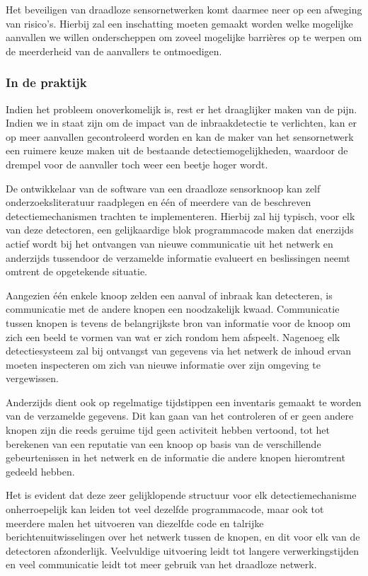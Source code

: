 \documentclass[DIV=calc,paper=a4,fontsize=11pt,twocolumn,draft]{scrartcl}
\newcommand{\heading}[1]{
\subsubsection*{#1}
\vspace{-2mm}
}
\begin{document}
Het beveiligen van draadloze sensornetwerken komt daarmee neer op een afweging
van risico's. Hierbij zal een inschatting moeten gemaakt worden welke mogelijke
aanvallen we willen onderscheppen om zoveel mogelijke barri\`eres op te werpen
om de meerderheid van de aanvallers te ontmoedigen.

\heading{In de praktijk}

Indien het probleem onoverkomelijk is, rest er het draaglijker maken van de
pijn. Indien we in staat zijn om de impact van de inbraakdetectie te
verlichten, kan er op meer aanvallen gecontroleerd worden en kan de maker van
het sensornetwerk een ruimere keuze maken uit de bestaande
detectiemogelijkheden, waardoor de drempel voor de aanvaller toch weer een
beetje hoger wordt.

De ontwikkelaar van de software van een draadloze sensorknoop kan zelf
onderzoeksliteratuur raadplegen en \'e\'en of meerdere van de beschreven
detectiemechanismen trachten te implementeren. Hierbij zal hij typisch, voor
elk van deze detectoren, een gelijkaardige blok programmacode maken dat
enerzijds actief wordt bij het ontvangen van nieuwe communicatie uit het
netwerk en anderzijds tussendoor de verzamelde informatie evalueert en
beslissingen neemt omtrent de opgetekende situatie.

Aangezien \'e\'en enkele knoop zelden een aanval of inbraak kan detecteren, is
communicatie met de andere knopen een noodzakelijk kwaad. Communicatie tussen
knopen is tevens de belangrijkste bron van informatie voor de knoop om zich een
beeld te vormen van wat er zich rondom hem afspeelt. Nagenoeg elk
detectiesysteem zal bij ontvangst van gegevens via het netwerk de inhoud ervan
moeten inspecteren om zich van nieuwe informatie over zijn omgeving te
vergewissen.

Anderzijds dient ook op regelmatige tijdstippen een inventaris gemaakt te
worden van de verzamelde gegevens. Dit kan gaan van het controleren of er geen
andere knopen zijn die reeds geruime tijd geen activiteit hebben vertoond, tot
het berekenen van een reputatie van een knoop op basis van de verschillende
gebeurtenissen in het netwerk en de informatie die andere knopen hieromtrent
gedeeld hebben.

Het is evident dat deze zeer gelijklopende structuur voor elk
detectiemechanisme onherroepelijk kan leiden tot veel dezelfde programmacode,
maar ook tot meerdere malen het uitvoeren van diezelfde code en talrijke
berichtenuitwisselingen over het netwerk tussen de knopen, en dit voor elk van
de detectoren afzonderlijk. Veelvuldige uitvoering leidt tot langere
verwerkingstijden en veel communicatie leidt tot meer gebruik van het draadloze
netwerk.
\end{document}
